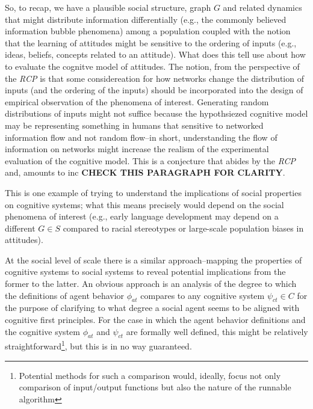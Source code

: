 \documentclass{article}
\begin{document}
So, to recap, we have a plausible social structure, graph $G$ and related dynamics that might distribute information differentially (e.g., the commonly believed information bubble phenomena) among a population coupled with the notion that the learning of attitudes might be sensitive to the ordering of inputs (e.g., ideas, beliefs, concepts related to an attitude).  What does this tell use about how to evaluate the cognitve model of attitudes.  The notion, from the perspective of the \textit{RCP} is that some considereation for how networks change the distribution of inputs (and the ordering of the inputs) should be incorporated into the design of empirical observation of the phenomena of interest.  Generating random distributions of inputs might not suffice because the hypothsiezed cognitive model may be representing something in humans that sensitive to networked information flow and not random flow--in short, understanding the flow of information on networks might increase the realism of the experimental evaluation of the cognitive model.   This is a conjecture that abides by the \textit{RCP} and, amounts to inc \textbf{CHECK THIS PARAGRAPH FOR CLARITY}.

This is one example of trying to understand the implications of social properties on cognitive systems; what this means precisely would depend on the social phenomena of interest (e.g., early language development may depend on a different $G \in S$ compared to racial stereotypes or large-scale population biases in attitudes).  

At the social level of scale there is a similar approach--mapping the properties of cognitive systems to social systems to reveal potential implications from the former to the latter.  An obvious approach is an analysis of the degree to which the definitions of agent behavior $\phi_{at}$ compares to any cognitive system $\psi_{ct} \in C$ for the purpose of clarifying to what degree a social agent seems to be aligned with cognitive first principles.  For the case in which the agent behavior definitions and the cognitive system $\phi_{at}$ and $\psi_{ct}$ are formally well defined, this might be relatively straightforward\footnote{Potential methods for such a comparison would, ideally, focus not only comparison of input/output functions but also the nature of the runnable algorithm}, but this is in no way guaranteed. 
\end{document}
